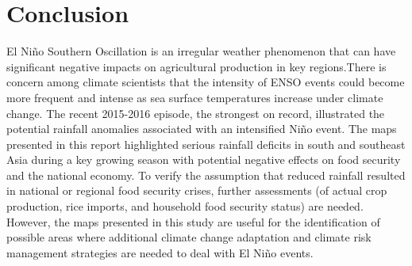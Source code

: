 \documentclass[12pt]{article}
\begin{document}
\section{Conclusion}
El Ni{\~n}o Southern Oscillation is an irregular weather phenomenon that can have significant negative impacts on agricultural production in key regions.There is concern among climate scientists that the intensity of ENSO events could become more frequent and intense as sea surface temperatures increase under climate change. The recent 2015-2016 episode, the strongest on record, illustrated the potential rainfall anomalies associated with an intensified Ni{\~n}o event. The maps presented in this report highlighted serious rainfall deficits in south and southeast Asia during a key growing season with potential negative effects on food security and the national economy. To verify the assumption that reduced rainfall resulted in national or regional food security crises, further assessments (of actual crop production, rice imports, and household food security status) are needed. However, the maps presented in this study are useful for the identification of possible areas where additional climate change adaptation and climate risk management strategies are needed to deal with El Ni{\~n}o events.



\end{document}
